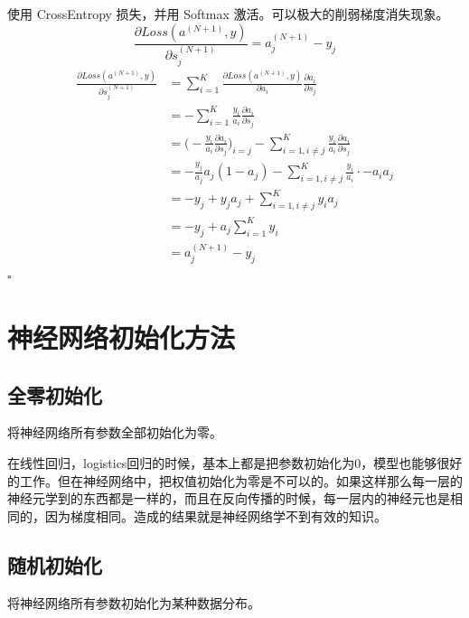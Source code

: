 \documentclass[UTF-8]{progbookcn}
\newenvironment{proof}{{\noindent\textbf{证明:}}}{\hfill $\square$\par}
\begin{document}
\begin{proof}使用 CrossEntropy 损失，并用 Softmax 激活。可以极大的削弱梯度消失现象。\\
  $$\frac{\partial Loss(a^{(N+1)}, y)}{\partial s^{(N+1)}_j} = a^{(N+1)}_j -y_j$$
  \begin{align*}
  \frac{\partial Loss(a^{(N+1)}, y)}{\partial s^{(N+1)}_j} & = \sum_{i=1}^{K} \frac{\partial Loss(a^{(N+1)}, y)}{\partial a_i}\frac{\partial a_i}{\partial s_j}\\
  & = -\sum_{i=1}^{K}\frac{y_i}{a_i}\frac{\partial a_i}{\partial s_j}\\
  &= \big(-\frac{y_i}{a_i}\frac{\partial a_i}{\partial s_j}\big)_{i=j}-\sum_{i=1,i\neq j}^{K}\frac{y_i}{a_i}\frac{\partial a_i}{\partial s_j}\\
  &= -\frac{y_j}{a_j}a_j(1-a_j)-\sum_{i=1,i\neq j}^{K}\frac{y_i}{a_i}\cdot -a_ia_j\\
  &=-y_j+y_ja_j+\sum_{i=1,i\neq j}^{K}y_ia_j\\
  & = -y_j+a_j\sum_{i=1}^{K}y_i\\
  & = a^{(N+1)}_j-y_j
\end{align*}
\end{proof}


\section{神经网络初始化方法}
\subsection{全零初始化}
\begin{keypoint}
将神经网络所有参数全部初始化为零。
\end{keypoint}

在线性回归，logistics回归的时候，基本上都是把参数初始化为0，模型也能够很好的工作。但在神经网络中，把权值初始化为零是不可以的。如果这样那么每一层的神经元学到的东西都是一样的，而且在反向传播的时候，每一层内的神经元也是相同的，因为梯度相同。造成的结果就是神经网络学不到有效的知识。

\subsection{随机初始化}
\begin{keypoint}
将神经网络所有参数初始化为某种数据分布\cite{DBLP:journals/mp/ChenCFM19}。
\end{keypoint}
\end{document}
